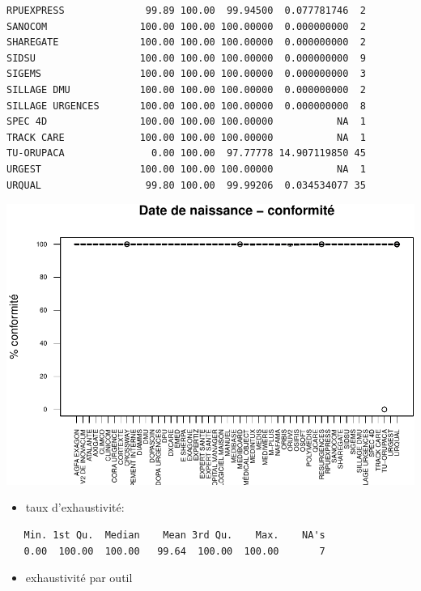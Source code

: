 \documentclass[]{article}
\begin{document}
\begin{verbatim}
RPUEXPRESS              99.89 100.00  99.94500  0.077781746  2
SANOCOM                100.00 100.00 100.00000  0.000000000  2
SHAREGATE              100.00 100.00 100.00000  0.000000000  2
SIDSU                  100.00 100.00 100.00000  0.000000000  9
SIGEMS                 100.00 100.00 100.00000  0.000000000  3
SILLAGE DMU            100.00 100.00 100.00000  0.000000000  2
SILLAGE URGENCES       100.00 100.00 100.00000  0.000000000  8
SPEC 4D                100.00 100.00 100.00000           NA  1
TRACK CARE             100.00 100.00 100.00000           NA  1
TU-ORUPACA               0.00 100.00  97.77778 14.907119850 45
URGEST                 100.00 100.00 100.00000           NA  1
URQUAL                  99.80 100.00  99.99206  0.034534077 35
\end{verbatim}

\includegraphics{septembre2015_files/figure-latex/unnamed-chunk-14-1.pdf}

\begin{itemize}
\itemsep1pt\parskip0pt
\item
  taux d'exhaustivité:
\end{itemize}

\begin{verbatim}
   Min. 1st Qu.  Median    Mean 3rd Qu.    Max.    NA's 
   0.00  100.00  100.00   99.64  100.00  100.00       7 
\end{verbatim}

\begin{itemize}
\itemsep1pt\parskip0pt
\item
  exhaustivité par outil
\end{itemize}
\end{document}
